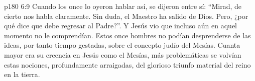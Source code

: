 \vs p180 6:9 Cuando los once lo oyeron hablar así, se dijeron entre sí: “Mirad, de cierto nos habla claramente. Sin duda, el Maestro ha salido de Dios. Pero, ¿por qué dice que debe regresar al Padre?”. Y Jesús vio que incluso aún en aquel momento no le comprendían. Estos once hombres no podían desprenderse de las ideas, por tanto tiempo gestadas, sobre el concepto judío del Mesías. Cuanta mayor era su creencia en Jesús como el Mesías, más problemáticas se volvían estas nociones, profundamente arraigadas, del glorioso triunfo material del reino en la tierra.

